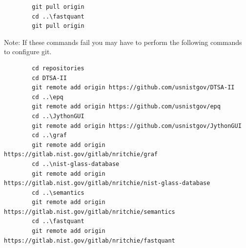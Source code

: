 \documentclass{article}
\begin{document}
\begin{enumerate}
\begin{verbatim}
        git pull origin
        cd ..\fastquant
        git pull origin
    \end{verbatim}
    Note: If these commands fail you may have to perform the following commands to configure git.
    \begin{verbatim}
        cd repositories
        cd DTSA-II
        git remote add origin https://github.com/usnistgov/DTSA-II
        cd ..\epq
        git remote add origin https://github.com/usnistgov/epq
        cd ..\JythonGUI
        git remote add origin https://github.com/usnistgov/JythonGUI
        cd ..\graf
        git remote add origin https://gitlab.nist.gov/gitlab/nritchie/graf
        cd ..\nist-glass-database
        git remote add origin https://gitlab.nist.gov/gitlab/nritchie/nist-glass-database
        cd ..\semantics
        git remote add origin https://gitlab.nist.gov/gitlab/nritchie/semantics
        cd ..\fastquant
        git remote add origin https://gitlab.nist.gov/gitlab/nritchie/fastquant
    \end{verbatim}    
    


\end{enumerate}
\end{document}
